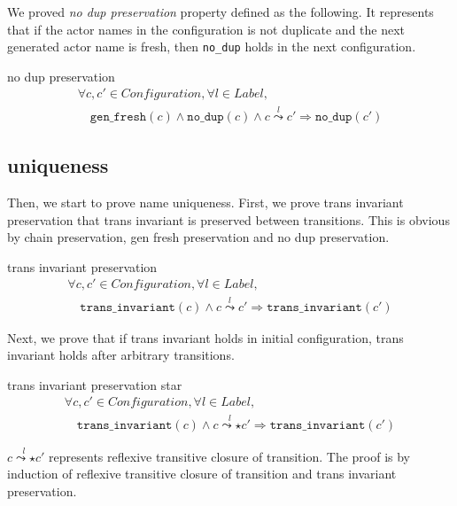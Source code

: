 We proved \textit{no dup preservation} property defined as the following.
It represents that if the actor names in the configuration is not duplicate and the next generated actor name is fresh, then \texttt{no\_dup} holds in the next configuration.

\begin{lemma}{no dup preservation}
\begin{displaymath}
  \begin{array}{l}
    \forall c, c' \in \textit{Configuration}, \forall l \in \textit{Label}, \\
    \quad \texttt{gen\_fresh}(c) \wedge \texttt{no\_dup}(c) \wedge c \overset{l}{\leadsto} c' \Rightarrow \texttt{no\_dup}(c')
  \end{array}
\end{displaymath}
\end{lemma}

\subsection{uniqueness}
Then, we start to prove name uniqueness.
First, we prove trans invariant preservation that trans invariant is preserved between transitions.
This is obvious by chain preservation, gen fresh preservation and no dup preservation.
\begin{lemma}{trans invariant preservation}
  \begin{displaymath}
    \begin{array}{l}
      \forall c, c' \in \textit{Configuration}, \forall l \in \textit{Label}, \\
      \quad \texttt{trans\_invariant}(c) \wedge c \overset{l}{\leadsto} c' \Rightarrow \texttt{trans\_invariant}(c')
    \end{array}
  \end{displaymath}
\end{lemma}

Next, we prove that if trans invariant holds in initial configuration, trans invariant holds after arbitrary transitions.


\begin{lemma}{trans invariant preservation star}
  \begin{displaymath}
    \begin{array}{l}
      \forall c, c' \in \textit{Configuration}, \forall l \in \textit{Label}, \\
      \quad \texttt{trans\_invariant}(c) \wedge c \overset{l}{\leadsto\star} c' \Rightarrow \texttt{trans\_invariant}(c')
    \end{array}
  \end{displaymath}
\end{lemma}
$c \overset{l}{\leadsto\star} c'$ represents reflexive transitive closure of transition.
The proof is by induction of reflexive transitive closure of transition and trans invariant preservation.

